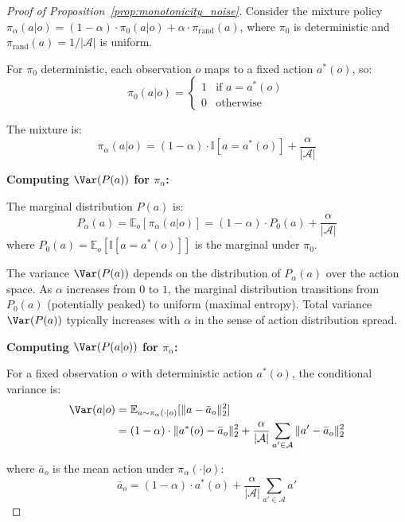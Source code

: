 \begin{proof}[Proof of Proposition~\ref{prop:monotonicity_noise}]
Consider the mixture policy $\pi_\alpha(a|o) = (1-\alpha) \cdot \pi_0(a|o) + \alpha \cdot \pi_{\mathrm{rand}}(a)$, where $\pi_0$ is deterministic and $\pi_{\mathrm{rand}}(a) = 1/|\mathcal{A}|$ is uniform.

For $\pi_0$ deterministic, each observation $o$ maps to a fixed action $a^*(o)$, so:
\begin{equation}
\pi_0(a|o) = \begin{cases}
1 & \text{if } a = a^*(o) \\
0 & \text{otherwise}
\end{cases}
\end{equation}

The mixture is:
\begin{equation}
\pi_\alpha(a|o) = (1-\alpha) \cdot \mathbb{I}[a = a^*(o)] + \frac{\alpha}{|\mathcal{A}|}
\end{equation}

\textbf{Computing $\Var(P(a))$ for $\pi_\alpha$:}

The marginal distribution $P(a)$ is:
\begin{equation}
P_\alpha(a) = \mathbb{E}_o[\pi_\alpha(a|o)] = (1-\alpha) \cdot P_0(a) + \frac{\alpha}{|\mathcal{A}|}
\end{equation}
where $P_0(a) = \mathbb{E}_o[\mathbb{I}[a = a^*(o)]]$ is the marginal under $\pi_0$.

The variance $\Var(P(a))$ depends on the distribution of $P_\alpha(a)$ over the action space. As $\alpha$ increases from $0$ to $1$, the marginal distribution transitions from $P_0(a)$ (potentially peaked) to uniform (maximal entropy). Total variance $\Var(P(a))$ typically increases with $\alpha$ in the sense of action distribution spread.

\textbf{Computing $\Var(P(a|o))$ for $\pi_\alpha$:}

For a fixed observation $o$ with deterministic action $a^*(o)$, the conditional variance is:
\begin{align}
\Var(a|o) &= \mathbb{E}_{a \sim \pi_\alpha(\cdot|o)}[\|a - \bar{a}_o\|_2^2] \\
&= (1-\alpha) \cdot \|a^*(o) - \bar{a}_o\|_2^2 + \frac{\alpha}{|\mathcal{A}|} \sum_{a' \in \mathcal{A}} \|a' - \bar{a}_o\|_2^2
\end{align}

where $\bar{a}_o$ is the mean action under $\pi_\alpha(\cdot|o)$:
\begin{equation}
\bar{a}_o = (1-\alpha) \cdot a^*(o) + \frac{\alpha}{|\mathcal{A}|} \sum_{a' \in \mathcal{A}} a'
\end{equation}


\end{proof}
